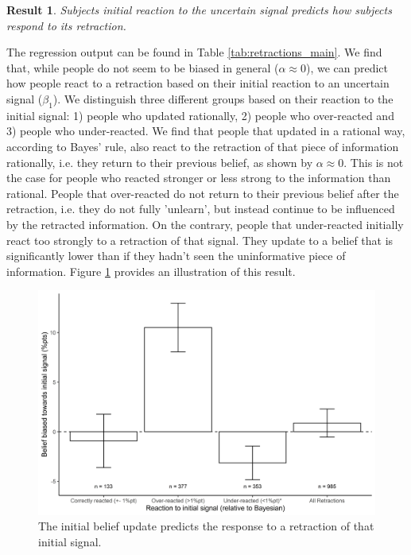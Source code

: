 \documentclass{article}
\newtheorem{result}{Result}
\newenvironment{Result}{\begin{result} \rm }{\end{result}}
\begin{document}
\begin{Result}
\label{result_retraction_previous}
Subjects initial reaction to the uncertain signal predicts how subjects respond to its retraction.
\end{Result}

The regression output can be found in Table \ref{tab:retractions_main}. We find that, while people do not seem to be biased in general ($\alpha\approx0$), we can predict how people react to a retraction based on their initial reaction to an uncertain signal ($\beta_1$). We distinguish three different groups based on their reaction to the initial signal: 1) people who updated rationally, 2) people who over-reacted and 3) people who under-reacted. We find that people that updated in a rational way, according to Bayes' rule, also react to the retraction of that piece of information rationally, i.e. they return to their previous belief, as shown by $\alpha\approx 0$. This is not the case for people who reacted stronger or less strong to the information than rational. People that over-reacted do not return to their previous belief after the retraction, i.e. they do not fully 'unlearn', but instead continue to be influenced by the retracted information. On the contrary, people that under-reacted initially react too strongly to a retraction of that signal. They update to a belief that is significantly lower than if they hadn't seen the uninformative piece of information. Figure \ref{fig:retraction_result_main} provides an illustration of this result.

\begin{figure}[!htb]
    \centering
    \includegraphics[width = 12cm]{Fig/02_fig_retract_diff_group.jpg}
    \caption{The initial belief update predicts the response to a retraction of that initial signal.}
    \label{fig:retraction_result_main}
\end{figure}
\end{document}
